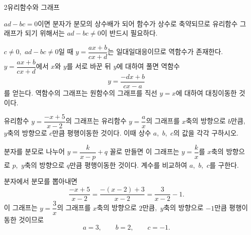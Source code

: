 \documentclass[10pt]{article}
\begin{document}
\begin{dmconcept}{2}{유리함수와 그래프}
\begin{dmnote}
$ad - bc = 0$이면 분자가 분모의 상수배가 되어 함수가 상수로 축약되므로 유리함수 그래프가 되기 위해서는 $ad - bc \ne 0$이 반드시 필요하다.
\end{dmnote}


$c \ne 0$,\ $ad - bc \ne 0$일 때 $y = \dfrac{ax + b}{cx + d}$는 일대일대응이므로 역함수가 존재한다. $y = \dfrac{ax + b}{cx + d}$에서 $x$와 $y$를 서로 바꾼 뒤 $y$에 대하여 풀면 역함수
\begin{equation*}
  y = \dfrac{-dx + b}{cx - a}
\end{equation*}
를 얻는다. 역함수의 그래프는 원함수의 그래프를 직선 $y = x$에 대하여 대칭이동한 것이다.

\end{dmconcept}

\newpage


\begin{dmproblem}
유리함수 $y = \dfrac{-x + 5}{x - 2}$의 그래프는 유리함수 $y = \dfrac{a}{x}$의 그래프를 $x$축의 방향으로 $b$만큼, $y$축의 방향으로 $c$만큼 평행이동한 것이다. 이때 상수 $a$,\ $b$,\ $c$의 값을 각각 구하시오.
\end{dmproblem}

\begin{dmapproach}
분자를 분모로 나누어 $y = \dfrac{k}{x - p} + q$ 꼴로 만들면 이 그래프는 $y = \dfrac{k}{x}$를 $x$축의 방향으로 $p$,\ $y$축의 방향으로 $q$만큼 평행이동한 것이다. 계수를 비교하여 $a$,\ $b$,\ $c$를 구한다.
\end{dmapproach}

\begin{dmsolution}
분자에서 분모를 뽑아내면
\begin{equation*}
  \frac{-x + 5}{x - 2} = \frac{-(x - 2) + 3}{x - 2} = \frac{3}{x - 2} - 1.
\end{equation*}
이 그래프는 $y = \dfrac{3}{x}$의 그래프를 $x$축의 방향으로 $2$만큼,\ $y$축의 방향으로 $-1$만큼 평행이동한 것이므로
$$a = 3,\qquad b = 2,\qquad c = -1.$$
\end{dmsolution}

\dmchecktitle

\end{document}
